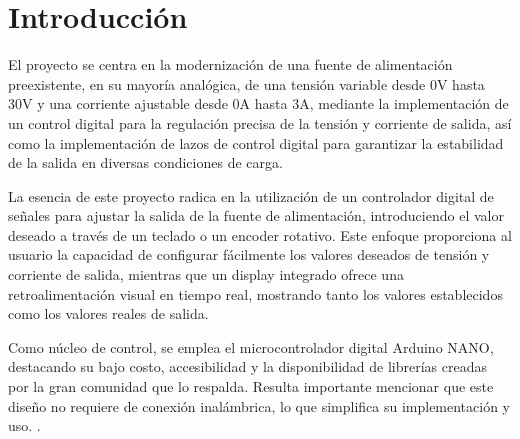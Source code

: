   \chapter{Introducción}

\label{C:introduccion}

El proyecto se centra en la modernización de una fuente de alimentación preexistente, en su mayoría analógica, de una tensión variable desde 0V hasta 30V y una corriente ajustable desde 0A hasta 3A, mediante la implementación de un control digital para la regulación precisa de la tensión y corriente de salida, así como la implementación de lazos de control digital para garantizar la estabilidad de la salida en diversas condiciones de carga. \par
La esencia de este proyecto radica en la utilización de un controlador digital de señales para ajustar la salida de la fuente de alimentación, introduciendo el valor deseado a través de un teclado o un encoder rotativo. Este enfoque proporciona al usuario la capacidad de configurar fácilmente los valores deseados de tensión y corriente de salida, mientras que un display integrado ofrece una retroalimentación visual en tiempo real, mostrando tanto los valores establecidos como los valores reales de salida.\par
Como núcleo de control, se emplea el microcontrolador digital Arduino NANO, destacando su bajo costo, accesibilidad y la disponibilidad de librerías creadas por la gran comunidad que lo respalda. Resulta importante mencionar que este diseño no requiere de conexión inalámbrica, lo que simplifica su implementación y uso.
 \cite{plantilla_universidad_de_costa_rica}.



